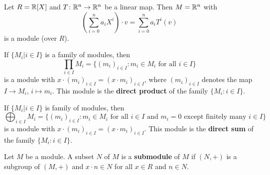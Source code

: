 %
\begin{example}
Let $R=\mathbb{R}[X]$ and $T\colon\mathbb{R}^n\to\mathbb{R}^n$ be a linear map. Then $M=\mathbb{R}^n$ with 
\[
\left(\sum_{i=0}^na_iX^i\right)\cdot v=\sum_{i=0}^na_iT^i(v)
\]	
is a module (over $R$).   
\end{example}

\begin{example}
If $\{M_i|i\in I\}$ is a family of modules, then  	
\[
\prod_{i\in I}M_i=\{(m_i)_{i\in I}:m_i\in M_i\text{ for all $i\in I$}\}
\]
is a module with 
$x\cdot (m_i)_{i\in I}=(x\cdot m_i)_{i\in I}$, 
where $(m_i)_{i\in I}$ denotes the map $I\to M_i$, $i\mapsto m_i$.
This module is the \textbf{direct product} of the family $\{M_i:i\in I\}$.
\end{example}
%
\begin{example}
If $\{M_i|i\in I\}$ is family of modules, then   	
\[
\bigoplus_{i\in I}M_i=\{(m_i)_{i\in I}:m_i\in M_i\text{ for all $i\in I$ and $m_i=0$ except finitely many $i\in I$}\}
\]
is a module with 
$x\cdot (m_i)_{i\in I}=(x\cdot m_i)_{i\in I}$. 
This module is the \textbf{direct sum} of the family $\{M_i:i\in I\}$. 
\end{example}
%
%
%
\begin{definition}
	Let $M$ be a module. A subset $N$ of $M$ is a \textbf{submodule} of $M$ if 
	$(N,+)$ is a subgroup of $(M,+)$ and 
	$x\cdot n\in N$ for all $x\in R$ and $n\in N$. 
\end{definition}

